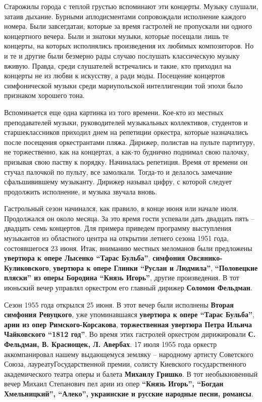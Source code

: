 Старожилы города с теплой грустью вспоминают эти концерты. Музыку слушали,
затаив дыхание. Бурными аплодисментами сопровождали исполнение каждого номера.
Были завсегдатаи, которые за время гастролей не пропускали ни одного
концертного вечера. Были и знатоки музыки, которые посещали лишь те концерты,
на которых исполнялись произведения их любимых композиторов. Но и те и другие
были безмерно рады случаю послушать классическую музыку вживую. Правда, среди
слушателей встречались и такие, кто приходил на концерты не из любви к
искусству, а ради моды. Посещение концертов симфонической музыки среди
мариупольской интеллигенции той эпохи было признаком хорошего тона.

Вспоминается еще одна картинка из того времени. Кое-кто из местных
преподавателей музыки, руководителей музыкальных коллективов, студентов и
старшеклассников приходил днем на репетиции оркестра, которые назначались после
посещения оркестрантами пляжа. Дирижер, полистав на пульте партитуру, не
торжественно, как на концертах, а как-то буднично поднимал свою палочку,
призывая свою паству к порядку. Начиналась репетиция. Время от времени он
стучал палочкой по пульту, все замолкали. Тогда-то и делалось замечание
сфальшивившему музыканту. Дирижер называл цифру, с которой следует продолжить
исполнение, и музыка звучала вновь.

Гастрольный сезон начинался, как правило, в конце июня или начале июля.
Продолжался он около месяца. За это время гости успевали дать двадцать пять –
двадцать семь концертов. Для примера приведем программу выступления музыкантов
из областного центра на открытии летнего сезона 1951 года, состоявшегося 23
июня. Итак, вниманию местных меломанов были предложены \textbf{увертюра к опере Лысенко
\enquote{Тарас Бульба}}, \textbf{симфония Овсянико-Куликовского}, \textbf{увертюра к опере Глинки \enquote{Руслан
и Людмила}}, \textbf{\enquote{Половецкие пляски} из оперы Бородина \enquote{Князь Игорь}}, другие
произведения. В тот июньский вечер управлял оркестром его главный дирижер
\textbf{Соломон Фельдман}.


Сезон 1955 года открылся 25 июня. В этот вечер были исполнены \textbf{Вторая симфония
Ревуцкого}, уже упоминавшаяся \textbf{увертюра к опере \enquote{Тарас Бульба}}, \textbf{арии из
опер Римского-Корсакова}, \textbf{торжественная увертюра Петра Ильича Чайковского
\enquote{1812 год}}.  Во время этих гастролей оркестром дирижировали \textbf{С.
Фельдман, В. Краснощек, Л.  Авербах}. 17 июля 1955 года оркестр аккомпанировал
нашему выдающемуся земляку – народному артисту Советского Союза,
лауреатуГосударственной премии, солисту Киевского государственного
академического театра оперы и балета \textbf{Михаилу Гришко}.  В тот необыкновенный
вечер Михаил Степанович пел арии из опер \textbf{\enquote{Князь Игорь}, \enquote{Богдан
Хмельницкий}, \enquote{Алеко}, украинские и русские народные песни, романсы}.

